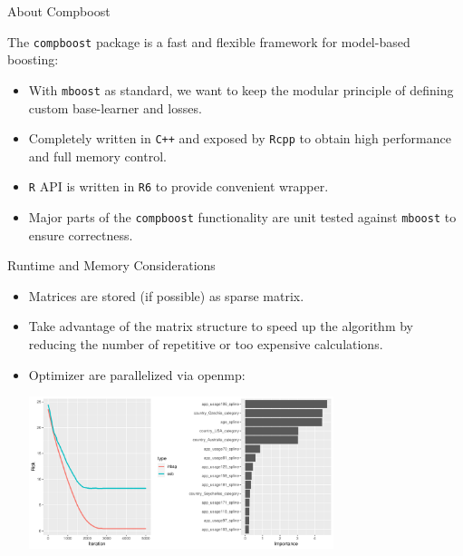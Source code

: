 \documentclass[10pt]{beamer}\usepackage[]{graphicx}\usepackage[]{color}
\newenvironment{knitrout}{}{} %
\begin{document}
\begin{frame}{About Compboost}


The \texttt{compboost} package is a fast and flexible framework for model-based boosting:

\begin{itemize}

  \item
    With \texttt{mboost} as standard, we want to keep the modular principle of defining custom base-learner and losses.

  \item
    Completely written in \texttt{C++} and exposed by \texttt{Rcpp} to obtain high performance and full memory control.

  \item
    \texttt{R} API is written in \texttt{R6} to provide convenient wrapper.

  \item
    Major parts of the \texttt{compboost} functionality are unit tested against \texttt{mboost} to ensure correctness.

\end{itemize}

\end{frame}


\begin{frame}{Runtime and Memory Considerations}

\begin{itemize}

  \item
    Matrices are stored (if possible) as sparse matrix.

  \item
    Take advantage of the matrix structure to speed up the algorithm by reducing the number of repetitive or too expensive calculations.

  \item
    Optimizer are parallelized via openmp:

\begin{knitrout}
\color{fgcolor}

{\centering \includegraphics[width=0.7\textwidth]{figure/unnamed-chunk-4-1} 

}



\end{knitrout}

\end{itemize}

\end{frame}
\end{document}
